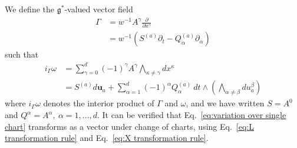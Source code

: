 We define the $\mathfrak{g}^*$-valued vector field
\begin{equation}
\begin{aligned}
\Gamma & = w^{-1} A^\gamma \frac{\partial}{\partial x^\gamma} \\
 &  = w^{-1} \left( S^{(a)} \partial_t - Q^{(a)}_\alpha \partial_\alpha \right)
\end{aligned}
\end{equation}
such that
\begin{equation} \label{eq:i_Gamma omega}
\begin{aligned}
i_\Gamma \omega & = \sum_{\gamma = 0}^d (-1)^\gamma A^\gamma \bigwedge_{\kappa \neq \gamma} dx^\kappa \\
& = S^{(a)} d \mathbf{u}_a + \sum_{\alpha=1}^d (-1)^\alpha Q^{(a)}_\alpha\ dt \wedge \left( \bigwedge_{\alpha \neq \beta} d u_a^\beta \right)
\end{aligned}
\end{equation}
where $i_\Gamma \omega$ denotes the interior product of $\Gamma$ and $\omega$, and we have written $S = A^0$ and $Q^\alpha = A^\alpha,\ \alpha = 1,\dots, d$. It can be verified that Eq.~\ref{eq:variation over single chart} transforms as a vector under change of charts, using Eq.~\ref{eq:L transformation rule} and Eq.~\ref{eq:X transformation rule}.

